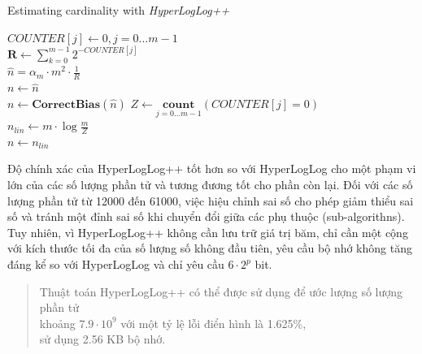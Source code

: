 \documentclass[letterpaper,13pt]{article}
\theoremstyle{mytheor}
\begin{document}
\begin{algorithm}[H]
    \vspace{0.25cm}
    \DontPrintSemicolon
    \LinesNumberedHidden
    \caption[]{Estimating cardinality with \textit{HyperLogLog++}}
    $COUNTER[j] \gets 0, j = 0 ... m-1$\\
    $\textbf{R} \gets \sum\limits_{k=0}^{m-1}2^{-COUNTER[j]}$\\
    $\hat{n} = \alpha_m \cdot m^2 \cdot \frac{1}{R}$\\
    $n \gets \hat{n}$\\
    {
        $n \gets \textbf{CorrectBias}(\hat{n})$
    }
    $Z \gets \underset{j=0...m-1}{\textbf{count}}(COUNTER[j] = 0)$\\
    {
        $n_{lin} \gets m \cdot \log\frac{m}{Z}$\\
        {
            $n \gets n_{lin}$
        }
    }
    \vspace{0.25cm}
\end{algorithm}

Độ chính xác của HyperLogLog++ tốt hơn so với HyperLogLog cho một phạm vi lớn của các số lượng phần tử và tương đương tốt cho phần còn lại. 
Đối với các số lượng phần tử từ 12000 đến 61000, việc hiệu chỉnh sai số cho phép giảm thiểu sai số và tránh một đỉnh sai số khi chuyển đổi 
giữa các phụ thuộc (sub-algorithns).\\

Tuy nhiên, vì HyperLogLog++ không cần lưu trữ giá trị băm, chỉ cần một cộng với kích thước tối đa của số lượng số không đầu tiên, yêu cầu bộ nhớ 
không tăng đáng kể so với HyperLogLog và chỉ yêu cầu $6 \cdot 2^p$ bit.\\

\begin{quote}
    Thuật toán HyperLogLog++ có thể được sử dụng để ước lượng số lượng phần tử \\
    khoảng $7.9 \cdot 10^9$ với một tỷ lệ lỗi điển hình là 1.625\%, \\
    sử dụng 2.56 KB bộ nhớ.
    \vspace{0.25cm}
\end{quote}
\\\\
\end{document}
